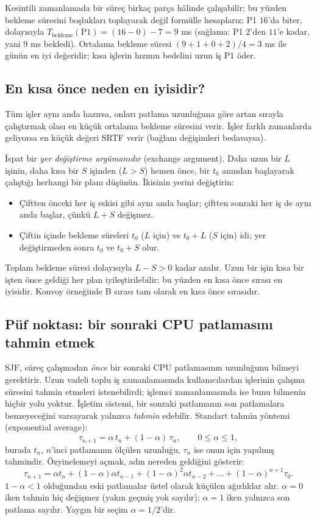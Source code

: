 Kesintili zamanlamada bir süreç birkaç parça hâlinde çalışabilir; bu yüzden bekleme süresini boşlukları toplayarak değil formülle hesaplarız: P1 $16$'da biter, dolayısıyla $T_{\text{bekleme}}(\text{P1}) = (16-0) - 7 = 9$ ms (sağlama: P1 $2$'den $11$'e kadar, yani $9$ ms bekledi). Ortalama bekleme süresi $(9+1+0+2)/4 = 3$ ms ile günün en iyi değeridir; kısa işlerin hızının bedelini uzun iş P1 öder.

\subsection{En kısa önce neden en iyisidir?}

\begin{keyidea}
Tüm işler aynı anda hazırsa, onları patlama uzunluğuna göre artan sırayla çalıştırmak olası en küçük ortalama bekleme süresini verir. İşler farklı zamanlarda geliyorsa en küçük değeri SRTF verir (bağlam değişimleri bedavaysa).
\end{keyidea}

İspat bir \emph{yer değiştirme argümanıdır} (exchange argument). Daha uzun bir $L$ işinin, daha kısa bir $S$ işinden ($L > S$) hemen önce, bir $t_0$ anından başlayarak çalıştığı herhangi bir planı düşünün. İkisinin yerini değiştirin:
\begin{itemize}
  \item Çiftten önceki her iş eskisi gibi aynı anda başlar; çiftten sonraki her iş de aynı anda başlar, çünkü $L+S$ değişmez.
  \item Çiftin içinde bekleme süreleri $t_0$ ($L$ için) ve $t_0+L$ ($S$ için) idi; yer değiştirmeden sonra $t_0$ ve $t_0+S$ olur.
\end{itemize}
Toplam bekleme süresi dolayısıyla $L-S>0$ kadar azalır. Uzun bir işin kısa bir işten önce geldiği her plan iyileştirilebilir; bu yüzden en kısa önce sırası en iyisidir. Konvoy örneğinde B sırası tam olarak en kısa önce sırasıdır.

\subsection{Püf noktası: bir sonraki CPU patlamasını tahmin etmek}

SJF, süreç çalışmadan \emph{önce} bir sonraki CPU patlamasının uzunluğunu bilmeyi gerektirir. Uzun vadeli toplu iş zamanlamasında kullanıcılardan işlerinin çalışma süresini tahmin etmeleri istenebilirdi; işlemci zamanlamasında ise bunu bilmenin hiçbir yolu yoktur. İşletim sistemi, bir sonraki patlamanın son patlamalara benzeyeceğini varsayarak yalnızca \emph{tahmin} edebilir. Standart tahmin yöntemi  (exponential average):
\[
\tau_{n+1} = \alpha\, t_n + (1-\alpha)\, \tau_n, \qquad 0 \le \alpha \le 1,
\]
burada $t_n$, $n$'inci patlamanın ölçülen uzunluğu, $\tau_n$ ise onun için yapılmış tahmindir. Özyinelemeyi açmak, adın nereden geldiğini gösterir:
\[
\tau_{n+1} = \alpha t_n + (1-\alpha)\alpha t_{n-1} + (1-\alpha)^2 \alpha t_{n-2} + \dots + (1-\alpha)^{n+1}\tau_0 .
\]
$1-\alpha<1$ olduğundan eski patlamalar üstel olarak küçülen ağırlıklar alır. $\alpha=0$ iken tahmin hiç değişmez (yakın geçmiş yok sayılır); $\alpha=1$ iken yalnızca son patlama sayılır. Yaygın bir seçim $\alpha = 1/2$'dir.

